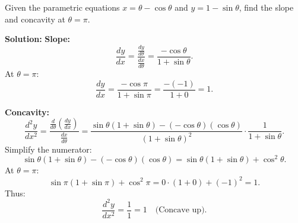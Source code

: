 \documentclass[12pt]{article}
\theoremstyle{beautifulthm}
\begin{document}
\begin{tcolorbox}[colback=examplebg, colframe=red!75!black, title=\textbf{EXAMPLE 2: Concavity}, fonttitle=\bfseries, sharp corners]
Given the parametric equations \( x = \theta - \cos \theta \) and \( y = 1 - \sin \theta \), find the slope and concavity at \( \theta = \pi \).



\tcblower
\textbf{Solution:} 
\textbf{Slope:}
\[
\frac{dy}{dx} = \frac{\frac{dy}{d\theta}}{\frac{dx}{d\theta}} = \frac{-\cos \theta}{1 + \sin \theta}.
\]
At \( \theta = \pi \):
\[
\frac{dy}{dx} = \frac{-\cos \pi}{1 + \sin \pi} = \frac{-(-1)}{1 + 0} = 1.
\]

\textbf{Concavity:}
\[
\frac{d^2y}{dx^2} = \frac{\frac{d}{d\theta}\left(\frac{dy}{dx}\right)}{\frac{dx}{d\theta}} = \frac{\sin \theta (1 + \sin \theta) - (-\cos \theta)(\cos \theta)}{(1 + \sin \theta)^2} \cdot \frac{1}{1 + \sin \theta}.
\]
Simplify the numerator:
\[
\sin \theta (1 + \sin \theta) - (-\cos \theta)(\cos \theta) = \sin \theta (1 + \sin \theta) + \cos^2 \theta.
\]
At \( \theta = \pi \):
\[
\sin \pi (1 + \sin \pi) + \cos^2 \pi = 0 \cdot (1 + 0) + (-1)^2 = 1.
\]
Thus:
\[
\frac{d^2y}{dx^2} = \frac{1}{1} = 1 \quad \text{(Concave up)}.
\]
\end{tcolorbox}
\end{document}
